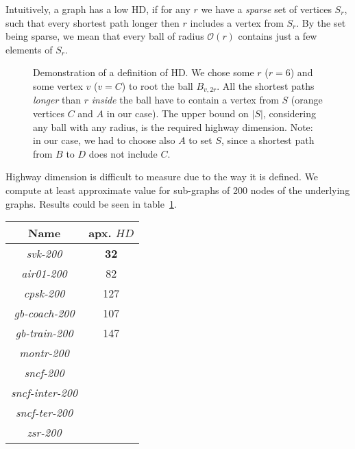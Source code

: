 	\noindent Intuitively, a graph has a low HD, if for any $r$ we have a \emph{sparse} set of vertices $S_{r}$, such that every shortest path longer then $r$ includes a vertex from $S_{r}$. By the set being sparse, we mean that every ball of radius $\mathcal{O}(r)$ contains just a few elements of $S_{r}$.

	\begin{figure}[h!]
    	\begin{center}
		\end{center}
        \caption{\label{fig:highdemonstr} Demonstration of a definition of HD. We chose some $r$ ($r = 6$) and some vertex $v$ ($v = C$) to root the ball $B_{v, 2r}$. All the shortest paths \emph{longer} than $r$ \emph{inside} the ball have to contain a vertex from $S$ (orange vertices $C$ and $A$ in our case). The upper bound on $|S|$, considering any ball with any radius, is the required highway dimension. Note: in our case, we had to choose also $A$ to set $S$, since a shortest path from $B$ to $D$ does not include $C$.}
	\end{figure}
	
	\noindent Highway dimension is difficult to measure due to the way it is defined. We compute at least approximate value for sub-graphs of 200 nodes of the underlying graphs. Results could be seen in table~\ref{table:ug_hd}.
	
	\begin{table}[H]
		\centering
		\begin{tabular}{c|c}
			\rowcolor{tablehead}
			\textbf{Name} & apx. $HD$ \\
			\hline
			\textit{svk-200} & \textbf{32} \\
			\textit{air01-200} & 82 \\
			\textit{cpsk-200} & 127 \\
			\textit{gb-coach-200} & 107 \\
			\textit{gb-train-200} & 147 \\
			\textit{montr-200} &  \\
			\textit{sncf-200} &  \\
			\textit{sncf-inter-200} &  \\
			\textit{sncf-ter-200} &  \\
			\textit{zsr-200} &  \\
		\end{tabular}
		\label{table:ug_hd}
	\end{table}
	